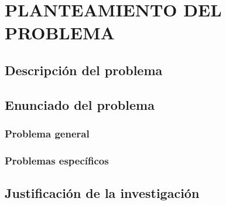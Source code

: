 \pagestyle{fancy}
\chapter{PLANTEAMIENTO DEL PROBLEMA}
\section{Descripción del problema}
\lipsum[4-5]
\section{Enunciado del problema}
\subsection{Problema general}
\subsection{Problemas específicos}
\section{Justificación de la investigación}
